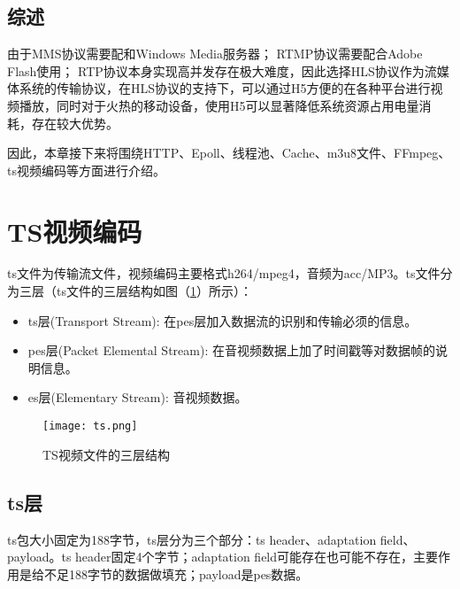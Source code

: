 \documentclass[bachelor]{thesis-uestc}
\begin{document}
\subsection{综述}

\par 由于MMS协议需要配和Windows Media服务器； RTMP协议需要配合Adobe Flash使用； RTP协议本身实现高并发存在极大难度，因此选择HLS协议作为流媒体系统的传输协议，在HLS协议的支持下，可以通过H5方便的在各种平台进行视频播放，同时对于火热的移动设备，使用H5可以显著降低系统资源占用电量消耗，存在较大优势。

\par 因此，本章接下来将围绕HTTP、Epoll、线程池、Cache、m3u8文件、FFmpeg、ts视频编码等方面进行介绍。

\section{TS视频编码}

ts文件为传输流文件，视频编码主要格式h264/mpeg4，音频为acc/MP3。ts文件分为三层（ts文件的三层结构如图（\ref{fig:ts}）所示）：

\begin{itemize}
	\item ts层(Transport Stream): 在pes层加入数据流的识别和传输必须的信息。
	\item pes层(Packet Elemental Stream): 在音视频数据上加了时间戳等对数据帧的说明信息。
	\item es层(Elementary Stream): 音视频数据。
\end{itemize}


\begin{figure}[h]
\texttt{[image: ts.png]}
\caption{TS视频文件的三层结构}
\label{fig:ts} 
\end{figure}

\subsection{ts层}
ts包大小固定为188字节，ts层分为三个部分：ts header、adaptation field、 payload。ts header固定4个字节；adaptation field可能存在也可能不存在，主要作用是给不足188字节的数据做填充；payload是pes数据。
     
\end{document}

